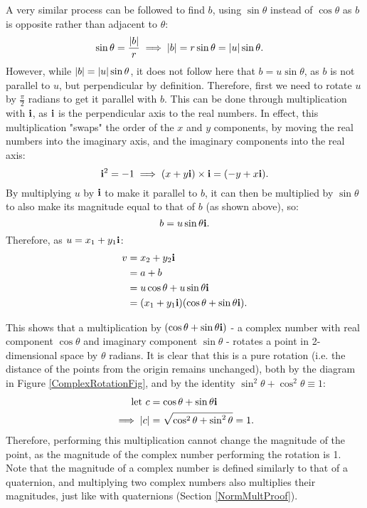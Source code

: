 \documentclass[10pt]{article}
\begin{document}
A very similar process can be followed to find $b$, using $\sin\theta$ instead of $\cos\theta$ as $b$ is opposite rather than adjacent to $\theta$:
\begin{equation}
    \begin{aligned}
        \sin\theta = \frac{\abs{b}}{r} &\implies \abs{b} = r\sin\theta = \abs{u}\sin\theta.
    \end{aligned}
\end{equation}
However, while $\abs{b} = \abs{u}\sin\theta$, it does not follow here that $b = u\sin\theta$, as $b$ is not parallel to $u$, but perpendicular by definition. Therefore, first we need to rotate $u$ by $\frac{\pi}{2}$ radians to get it parallel with $b$. This can be done through multiplication with $\vb{i}$, as $\vb{i}$ is the perpendicular axis to the real numbers. In effect, this multiplication "swaps" the order of the $x$ and $y$ components, by moving the real numbers into the imaginary axis, and the imaginary components into the real axis:
\begin{equation}
    \vb{i}^2 = -1 \implies (x + y\vb{i}) \times \vb{i} = (-y + x\vb{i}).
\end{equation}
By multiplying $u$ by $\vb{i}$ to make it parallel to $b$, it can then be multiplied by $\sin\theta$ to also make its magnitude equal to that of $b$ (as shown above), so:
\begin{equation}
    b = u\sin\theta\vb{i}.
\end{equation}
Therefore, as $u = x_1 + y_1\vb{i}$:
\begin{equation}
    \begin{aligned}
        v =\phantom{ } & x_2 + y_2\vb{i} \\
        =\phantom{ }& a + b \\
        =\phantom{ }& u\cos\theta + u\sin\theta\vb{i} \\
        =\phantom{ }& (x_1 + y_1\vb{i})(\cos\theta + \sin\theta\vb{i}).
    \end{aligned}
\end{equation}

This shows that a multiplication by $(\cos\theta + \sin\theta\vb{i})$ - a complex number with real component $\cos\theta$ and imaginary component $\sin\theta$ - rotates a point in 2-dimensional space by $\theta$ radians. It is clear that this is a pure rotation (i.e. the distance of the points from the origin remains unchanged), both by the diagram in Figure \ref{ComplexRotationFig}, and by the identity $\sin^2\theta + \cos^2\theta \equiv 1$:
\begin{equation}
    \begin{aligned}
        \text{let } c &= \cos\theta + \sin\theta\vb{i} \\
        \implies \abs{c} &= \sqrt{\cos^2\theta + \sin^2\theta} = 1.
    \end{aligned}
\end{equation}
Therefore, performing this multiplication cannot change the magnitude of the point, as the magnitude of the complex number performing the rotation is 1. Note that the magnitude of a complex number is defined similarly to that of a quaternion, and multiplying two complex numbers also multiplies their magnitudes, just like with quaternions (Section \ref{NormMultProof}).
\end{document}
